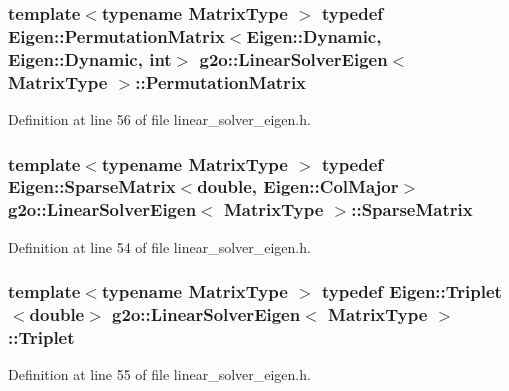 \subsubsection[{\texorpdfstring{Permutation\+Matrix}{PermutationMatrix}}]{\setlength{\rightskip}{0pt plus 5cm}template$<$typename Matrix\+Type $>$ typedef Eigen\+::\+Permutation\+Matrix$<$Eigen\+::\+Dynamic, Eigen\+::\+Dynamic, int$>$ {\bf g2o\+::\+Linear\+Solver\+Eigen}$<$ Matrix\+Type $>$\+::{\bf Permutation\+Matrix}}\hypertarget{classg2o_1_1LinearSolverEigen_a86afb924e2b1d3ebd9b9d4a318eded44}{}\label{classg2o_1_1LinearSolverEigen_a86afb924e2b1d3ebd9b9d4a318eded44}


Definition at line 56 of file linear\+\_\+solver\+\_\+eigen.\+h.

\subsubsection[{\texorpdfstring{Sparse\+Matrix}{SparseMatrix}}]{\setlength{\rightskip}{0pt plus 5cm}template$<$typename Matrix\+Type $>$ typedef Eigen\+::\+Sparse\+Matrix$<$double, Eigen\+::\+Col\+Major$>$ {\bf g2o\+::\+Linear\+Solver\+Eigen}$<$ Matrix\+Type $>$\+::{\bf Sparse\+Matrix}}\hypertarget{classg2o_1_1LinearSolverEigen_aeb7e2400bed3a249b5f29ce7cc00cd33}{}\label{classg2o_1_1LinearSolverEigen_aeb7e2400bed3a249b5f29ce7cc00cd33}


Definition at line 54 of file linear\+\_\+solver\+\_\+eigen.\+h.

\subsubsection[{\texorpdfstring{Triplet}{Triplet}}]{\setlength{\rightskip}{0pt plus 5cm}template$<$typename Matrix\+Type $>$ typedef Eigen\+::\+Triplet$<$double$>$ {\bf g2o\+::\+Linear\+Solver\+Eigen}$<$ Matrix\+Type $>$\+::{\bf Triplet}}\hypertarget{classg2o_1_1LinearSolverEigen_a602c24e05d2f46022aa1827fdbc45638}{}\label{classg2o_1_1LinearSolverEigen_a602c24e05d2f46022aa1827fdbc45638}


Definition at line 55 of file linear\+\_\+solver\+\_\+eigen.\+h.



